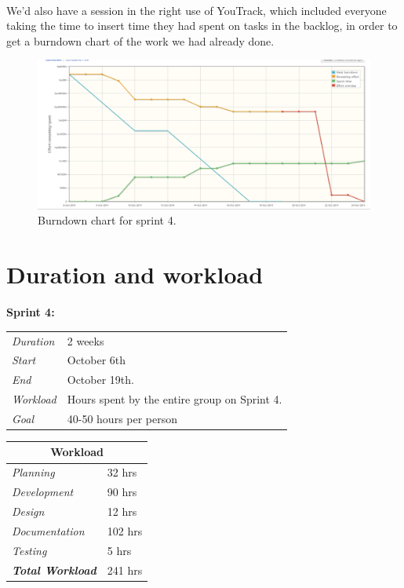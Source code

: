 \paragraph{} We'd also have a session in the right use of YouTrack, which included everyone taking the time to insert time they had spent on tasks in the backlog, in order to get a burndown chart of the work we had already done.

\begin{figure}[ht!]
  \centering
  \includegraphics[width=\linewidth]{./Sprint4/img/burndown}
  \caption{Burndown chart for sprint 4.}
  \label{fig:S4PlanBurndown}
\end{figure}

\section{Duration and workload}
\label{sec:S4Duration}

\begin{minipage}{\linewidth}
\centering
\setlength{\tabcolsep}{22pt}
\textbf{Sprint 4:} 
\smallskip
{}
\begin{tabular}{ |l l| }
	\hline
	\it{Duration} & 2 weeks \\
	\it{Start} & October 6th \\
	\it{End} & October 19th. \\
	\it{Workload} & Hours spent by the entire group on Sprint 4. \\
	\it{Goal} & 40-50 hours per person \\
	\hline
\end{tabular}
\end{minipage}

\begin{minipage}{\linewidth}
\setlength{\tabcolsep}{15pt}
\centering
{}
\begin{tabular}{ |l|l| }
	\hline
	\multicolumn{2}{|c|}{\cellcolor{gray!25} Workload} \\
	\hline
	\it{Planning} & 32 hrs\\
	\it{Development} & 90 hrs\\
	\it{Design} & 12 hrs\\
	\it{Documentation} & 102 hrs\\
	\it{Testing} & 5 hrs\\
	\hline
	\textbf{\textit{Total Workload}} & 241 hrs\\
	\hline
\end{tabular}
\end{minipage}


